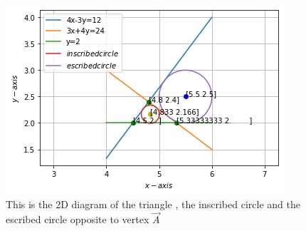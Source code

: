 \begin{figure}[!]
 \begin{center}
  \includegraphics[width=\columnwidth]{solutions/2/4/8/assignment4_fig.png}
    \caption{This is the 2D diagram of the triangle , the inscribed circle and the escribed circle opposite to vertex $\vec{A}$}
    \label{eq:solutions/2/4/8/myfig:1}
    \end{center}
\end{figure}
